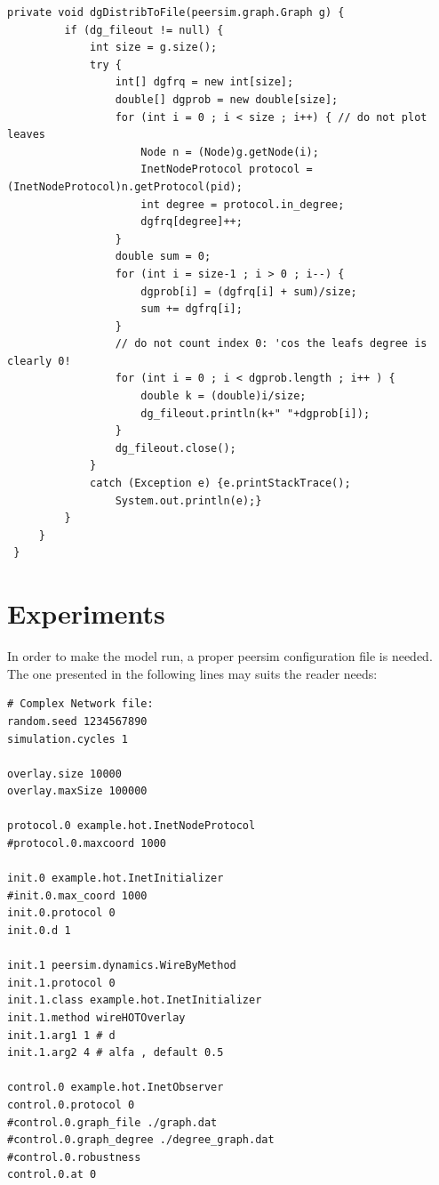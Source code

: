 \documentclass[a4paper,12pt]{article}
\begin{document}
\footnotesize
\begin{verbatim}
private void dgDistribToFile(peersim.graph.Graph g) {
         if (dg_fileout != null) { 
             int size = g.size();
             try {
                 int[] dgfrq = new int[size];
                 double[] dgprob = new double[size];
                 for (int i = 0 ; i < size ; i++) { // do not plot leaves
                     Node n = (Node)g.getNode(i);
                     InetNodeProtocol protocol = (InetNodeProtocol)n.getProtocol(pid);
                     int degree = protocol.in_degree;
                     dgfrq[degree]++;
                 }
                 double sum = 0;
                 for (int i = size-1 ; i > 0 ; i--) {
                     dgprob[i] = (dgfrq[i] + sum)/size;
                     sum += dgfrq[i];
                 }
                 // do not count index 0: 'cos the leafs degree is clearly 0!
                 for (int i = 0 ; i < dgprob.length ; i++ ) {
                     double k = (double)i/size;
                     dg_fileout.println(k+" "+dgprob[i]);
                 }
                 dg_fileout.close();
             }
             catch (Exception e) {e.printStackTrace();
                 System.out.println(e);}
         }   
     }
 }
\end{verbatim}
\normalsize


\section{Experiments}

 In order to make the model run, a proper peersim configuration file is 
needed. The one presented in the following lines may suits the reader needs:

\footnotesize
\begin{verbatim}
# Complex Network file:
random.seed 1234567890
simulation.cycles 1

overlay.size 10000
overlay.maxSize 100000

protocol.0 example.hot.InetNodeProtocol
#protocol.0.maxcoord 1000

init.0 example.hot.InetInitializer
#init.0.max_coord 1000
init.0.protocol 0
init.0.d 1

init.1 peersim.dynamics.WireByMethod
init.1.protocol 0
init.1.class example.hot.InetInitializer
init.1.method wireHOTOverlay
init.1.arg1 1 # d
init.1.arg2 4 # alfa , default 0.5   

control.0 example.hot.InetObserver
control.0.protocol 0
#control.0.graph_file ./graph.dat
#control.0.graph_degree ./degree_graph.dat
#control.0.robustness
control.0.at 0
\end{verbatim}
\normalsize
\end{document}
